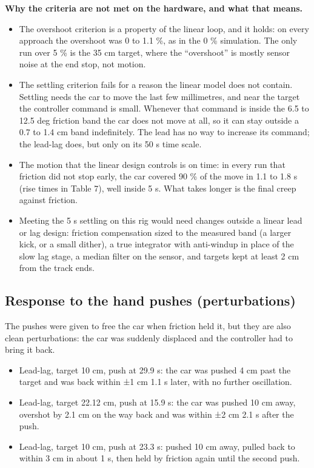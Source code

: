 \documentclass[11pt,a4paper]{article}
\providecommand{\tightlist}{\setlength{\itemsep}{0pt}\setlength{\parskip}{0pt}}
\begin{document}
\textbf{Why the criteria are not met on the hardware, and what that means.}
\begin{itemize}
\tightlist
\item
  The overshoot criterion is a property of the linear loop, and it holds: on every approach the overshoot was 0 to 1.1 \%, as in the 0 \% simulation. The only run over 5 \% is the 35 cm target, where the ``overshoot'' is mostly sensor noise at the end stop, not motion.
\item
  The settling criterion fails for a reason the linear model does not contain. Settling needs the car to move the last few millimetres, and near the target the controller command is small. Whenever that command is inside the 6.5 to 12.5 deg friction band the car does not move at all, so it can stay outside a 0.7 to 1.4 cm band indefinitely. The lead has no way to increase its command; the lead-lag does, but only on its 50 s time scale.
\item
  The motion that the linear design controls is on time: in every run that friction did not stop early, the car covered 90 \% of the move in 1.1 to 1.8 s (rise times in Table 7), well inside 5 s. What takes longer is the final creep against friction.
\item
  Meeting the 5 s settling on this rig would need changes outside a linear lead or lag design: friction compensation sized to the measured band (a larger kick, or a small dither), a true integrator with anti-windup in place of the slow lag stage, a median filter on the sensor, and targets kept at least 2 cm from the track ends.
\end{itemize}

\hypertarget{response-to-the-hand-pushes-perturbations}{%
\subsection{Response to the hand pushes
(perturbations)}\label{response-to-the-hand-pushes-perturbations}}

The pushes were given to free the car when friction held it, but they
are also clean perturbations: the car was suddenly displaced and the
controller had to bring it back.

\begin{itemize}
\tightlist
\item
  Lead-lag, target 10 cm, push at 29.9 s: the car was pushed 4 cm past
  the target and was back within ±1 cm 1.1 s later, with no further
  oscillation.
\item
  Lead-lag, target 22.12 cm, push at 15.9 s: the car was pushed 10 cm
  away, overshot by 2.1 cm on the way back and was within ±2 cm 2.1 s
  after the push.
\item
  Lead-lag, target 10 cm, push at 23.3 s: pushed 10 cm away, pulled back
  to within 3 cm in about 1 s, then held by friction again until the
  second push.
\end{itemize}
\end{document}
